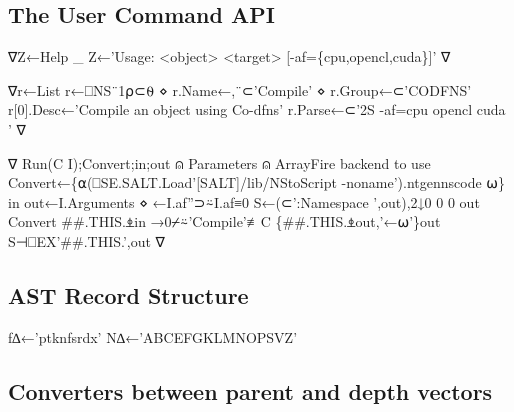 \documentclass{article}%
\begin{document}
\subsection{The User Command API}

\nwenddocs{}\endmoddef\nwstartdeflinemarkup{}\nwenddeflinemarkup
∇Z←Help _
 Z←'Usage: <object> <target> [-af=\{cpu,opencl,cuda\}]'
∇

∇r←List
 r←⎕NS¨1⍴⊂⍬ ⋄ r.Name←,¨⊂'Compile' ⋄ r.Group←⊂'CODFNS'
 r[0].Desc←'Compile an object using Co-dfns'
 r.Parse←⊂'2S -af=cpu opencl cuda '
∇

∇ Run(C I);Convert;in;out
⍝ Parameters
⍝              ArrayFire backend to use
 Convert←\{⍺(⎕SE.SALT.Load'[SALT]/lib/NStoScript -noname').ntgennscode ⍵\}
 in out←I.Arguments ⋄ ←I.af''⊃⍨I.af≡0
 S←(⊂':Namespace ',out),2↓0 0 0 out Convert ##.THIS.⍎in
 →0⌿⍨'Compile'≢C
 \{##.THIS.⍎out,'←⍵'\}out  S⊣⎕EX'##.THIS.',out
∇
\nwendcode{}\nwdocspar

\subsection{AST Record Structure}

\nwenddocs{}\endmoddef\nwstartdeflinemarkup{}\nwenddeflinemarkup
f∆←'ptknfsrdx'
N∆←'ABCEFGKLMNOPSVZ'
\nwendcode{}\nwdocspar

\subsection{Converters between parent and depth vectors}
\end{document}
